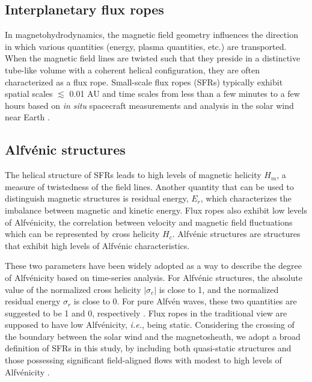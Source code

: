 \subsection{Interplanetary flux ropes}
In magnetohydrodynamics, the magnetic field geometry influences the direction in which various quantities (energy, plasma quantities, etc.) are transported. When the magnetic field lines are twisted such that they preside in a distinctive tube-like volume with a coherent helical configuration, they are often characterized as a flux rope. Small-scale flux ropes (SFRs) typically exhibit spatial scales $\lesssim$ 0.01 AU and time scales from less than a few minutes to a few hours based on \textit{in situ} spacecraft measurements and analysis in the solar wind near Earth \citep{Cartwright:2010, Feng:2007, Hu:2018}.

\subsection{Alfv\'enic structures}
The helical structure of SFRs leads to high levels of magnetic helicity $H_m$, a measure of twistedness of the field lines. Another quantity that can be used to distinguish magnetic structures is residual energy, $E_r$, which characterizes the imbalance between magnetic and kinetic energy. Flux ropes also exhibit low levels of Alfv\'enicity, the correlation between velocity and magnetic field fluctuations which can be represented by cross helicity $H_c$. Alfv\'enic structures are structures that exhibit high levels of Alfv\'enic characteristics.

These two parameters have been widely adopted as a way to describe the degree of Alfv\'enicity based on time-series analysis. For Alfv\'enic structures, the absolute value of the normalized cross helicity $|\sigma_c|$ is close to 1, and the normalized residual energy $\sigma_r$ is close to 0. For pure Alfv\'en waves, these two quantities are suggested to be 1 and 0, respectively \citep{Bruno:2013}. Flux ropes in the traditional view are supposed to have low Alfv\'enicity, \textit{i.e.}, being static. Considering the crossing of the boundary between the solar wind and the magnetosheath, we adopt a broad definition of SFRs in this study, by including both quasi-static structures and those possessing significant field-aligned flows with modest to high levels of Alfv\'enicity \citep{Chen:2022}.

